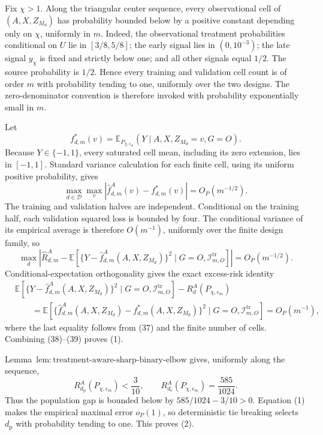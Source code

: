Fix \(\chi>1\).  Along the triangular center sequence, every observational cell of \((A,X,Z_{M_d})\) has probability bounded below by a positive constant depending only on \(\chi\), uniformly in \(m\).  Indeed, the observational treatment probabilities conditional on \(U\) lie in \([3/8,5/8]\); the early signal lies in \((0,10^{-3})\); the late signal \(y_\chi\) is fixed and strictly below one; and all other signals equal \(1/2\).  The source probability is \(1/2\).  Hence every training and validation cell count is of order \(m\) with probability tending to one, uniformly over the two designs.  The zero-denominator convention is therefore invoked with probability exponentially small in \(m\).

Let
\[
 f_{d,m}^*(v)=\mathbb E_{P_{\chi,\epsilon_m}}(Y\mid A,X,Z_{M_d}=v,G=O).
\]
Because \(Y\in\{-1,1\}\), every saturated cell mean, including its zero extension, lies in \([-1,1]\).  Standard variance calculation for each finite cell, using its uniform positive probability, gives
\[
 \max_{d\in\mathcal D}\max_v
 |\widehat f_{d,m}^A(v)-f_{d,m}^*(v)|=O_P(m^{-1/2}).        \tag{37}
\]
The training and validation halves are independent.  Conditional on the training half, each validation squared loss is bounded by four.  The conditional variance of its empirical average is therefore \(O(m^{-1})\), uniformly over the finite design family, so
\[
 \max_d\left|\widehat R_{d,m}^A-
 \mathbb E\!\left[\{Y-\widehat f_{d,m}^A(A,X,Z_{M_d})\}^2
 \mid G=O,\mathcal I_{m,O}^{\mathrm{tr}}\right]\right|
 =O_P(m^{-1/2}).                                           \tag{38}
\]
Conditional-expectation orthogonality gives the exact excess-risk identity
\[
 \begin{aligned}
 &\mathbb E\!\left[\{Y-\widehat f_{d,m}^A(A,X,Z_{M_d})\}^2\mid G=O,
 \mathcal I_{m,O}^{\mathrm{tr}}\right]-R_d^A(P_{\chi,\epsilon_m})\\
 &\qquad=\mathbb E\!\left[
 \{\widehat f_{d,m}^A(A,X,Z_{M_d})-f_{d,m}^*(A,X,Z_{M_d})\}^2
 \mid G=O,\mathcal I_{m,O}^{\mathrm{tr}}\right]
 =O_P(m^{-1}),                                             \tag{39}
 \end{aligned}
\]
where the last equality follows from (37) and the finite number of cells.  Combining (38)--(39) proves (1).

Lemma~\(\mathrm{lem{:}treatment\text{-}aware\text{-}sharp\text{-}binary\text{-}elbow}\) gives, uniformly along the sequence,
\[
 R_{d_{\mathrm p}}^A(P_{\chi,\epsilon_m})<\frac3{10},
 \qquad
 R_{d_{\mathrm e}}^A(P_{\chi,\epsilon_m})=\frac{585}{1024}.
\]
Thus the population gap is bounded below by \(585/1024-3/10>0\).  Equation (1) makes the empirical maximal error \(o_P(1)\), so deterministic tie breaking selects \(d_{\mathrm p}\) with probability tending to one.  This proves (2).

